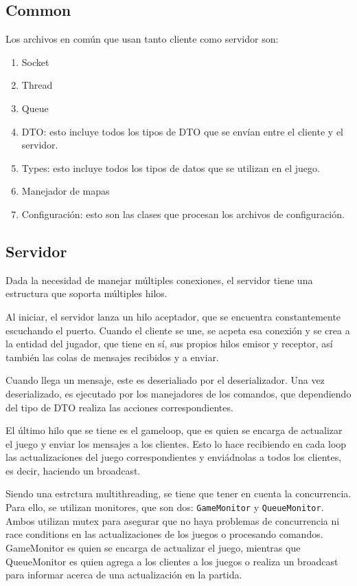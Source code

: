 \documentclass[titlepage,a4paper]{article}
\begin{document}
\subsection{Common}
Los archivos en común que usan tanto cliente como servidor son:

\begin{enumerate}
  \item Socket
  \item Thread
  \item Queue
  \item DTO: esto incluye todos los tipos de DTO que se envían entre el cliente y el servidor.
  \item Types: esto incluye todos los tipos de datos que se utilizan en el juego.
  \item Manejador de mapas
  \item Configuración: esto son las clases que procesan los archivos de configuración.
\end{enumerate}

\subsection{Servidor}
Dada la necesidad de manejar múltiples conexiones, el servidor tiene una estructura que soporta múltiples hilos.

Al iniciar, el servidor lanza un hilo aceptador, que se encuentra constantemente escuchando el puerto. Cuando el cliente se une, se acpeta esa conexión y se crea a la entidad del jugador, que tiene en sí, sus propios hilos emisor y receptor, así también las colas de mensajes recibidos y a enviar.

Cuando llega un mensaje, este es deserialiado por el deserializador. Una vez deserializado, es ejecutado por los manejadores de los comandos, que dependiendo del tipo de DTO realiza las acciones correspondientes. 

El último hilo que se tiene es el gameloop, que es quien se encarga de actualizar el juego y enviar los mensajes a los clientes. Esto lo hace recibiendo en cada loop las actualizaciones del juego correspondientes y enviádnolas a todos los clientes, es decir, haciendo un broadcast.

Siendo una estrctura multithreading, se tiene que tener en cuenta la concurrencia. Para ello, se utilizan monitores, que son dos: \texttt{GameMonitor} y \texttt{QueueMonitor}. Ambos utilizan mutex para asegurar que no haya problemas de concurrencia ni race conditions en las actualizaciones de los juegos o procesando comandos. GameMonitor es quien se encarga de actualizar el juego, mientras que QueueMonitor es quien agrega a los clientes a los juegos o realiza un broadcast para informar acerca de una actualización en la partida.
\end{document}
